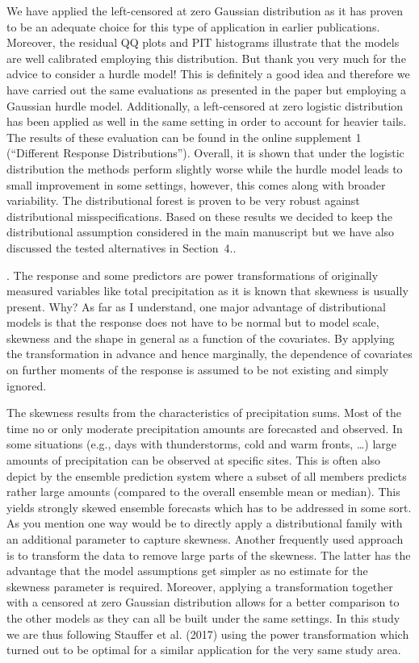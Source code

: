 \documentclass[american,foldmarks=false,noconfig]{uibklttr}
\newenvironment{review}{\fontshape{\itdefault}\fontseries{\bfdefault} \selectfont \smallskip}{\par}
\begin{document}
We have applied the left-censored at zero Gaussian distribution
as it has proven to be an adequate choice for this type of 
application in earlier publications.
Moreover, the residual QQ plots and PIT histograms illustrate
that the models are well calibrated employing this distribution.
But thank you very much for the advice to consider a hurdle model!
This is definitely a good idea and therefore we have carried out the
same evaluations as presented in the paper but employing a
Gaussian hurdle model. Additionally, a left-censored at zero logistic
distribution has been applied as well in the same setting in
order to account for heavier tails. The results of these evaluation
can be found in the online supplement 1 (``Different Response Distributions''). 
Overall, it is shown that under the logistic distribution the methods perform 
slightly worse while the hurdle model leads to small improvement in some settings,
however, this comes along with broader variability. The distributional 
forest is proven to be very robust against distributional misspecifications.
Based on these results we decided to keep the distributional assumption
considered in the main manuscript but we have also discussed the tested
alternatives in Section~4..


\begin{review}
2. The response and some predictors are power transformations 
of originally measured variables like total precipitation as 
it is known that skewness is usually present. Why? As far as I 
understand, one major advantage of distributional models is
that the response does not have to be normal but to model scale, 
skewness and the shape in general as a function of the covariates. 
By applying the transformation in advance and hence marginally, 
the dependence of covariates on further moments of the response 
is assumed to be not existing and simply ignored.
\end{review}

The skewness results from the characteristics of precipitation sums. 
Most of the time no or only moderate precipitation amounts are forecasted 
and observed. In some situations (e.g., days with thunderstorms, cold and 
warm fronts, \dots) large amounts of precipitation can be observed at 
specific sites. This is often also depict by the ensemble prediction 
system where a subset of all members predicts rather large amounts 
(compared to the overall ensemble mean or median). This yields strongly 
skewed ensemble forecasts which has to be addressed in some sort.\\
As you mention one way would be to directly apply a
distributional family with an additional parameter to capture
skewness. Another frequently used approach is to transform the 
data to remove large parts of the skewness. The latter has the 
advantage that the model assumptions get simpler as no estimate 
for the skewness parameter is required. 
Moreover, applying a transformation together with a censored 
at zero Gaussian distribution allows for a better comparison 
to the other models as they can all be built under the same 
settings.
In this study we are thus following Stauffer et al. (2017) 
using the power transformation which turned out to be optimal 
for a similar application for the very same study area.
\end{document}
